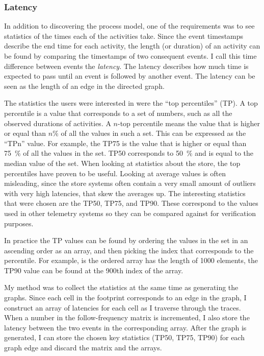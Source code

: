 \subsubsection{Latency}
\label{sec:latency}

In addition to discovering the process model, one of the requirements was to see statistics of the times each of the activities take. 
Since the event timestamps describe the end time for each activity, the length (or duration) of an activity can be found by comparing the timestamps of two consequent events. 
I call this time difference between events the \emph{latency}.
The latency describes how much time is expected to pass until an event is followed by another event.
The latency can be seen as the length of an edge in the directed graph.

The statistics the users were interested in were the ``top percentiles'' (TP).
A top percentile is a value that corresponds to a set of numbers, such as all the observed durations of activities.
A $n$-top percentile means the value that is higher or equal than $n\%$ of all the values in such a set.
This can be expressed as the ``TPn'' value.
For example, the TP75 is the value that is higher or equal than 75~\% of all the values in the set.
TP50 corresponds to 50~\% and is equal to the median value of the set.
When looking at statistics about the store, the top percentiles have proven to be useful.
Looking at average values is often misleading, since the store systems often contain a very small amount of outliers with very high latencies, that skew the averages up.
The interesting statistics that were chosen are the TP50, TP75, and TP90. 
These correspond to the values used in other telemetry systems so they can be compared against for verification purposes.

In practice the TP values can be found by ordering the values in the set in an ascending order as an array, and then picking the index that corresponds to the percentile. For example, is the ordered array has the length of 1000 elements, the TP90 value can be found at the 900th index of the array.

My method was to collect the statistics at the same time as generating the graphs.
Since each cell in the footprint corresponds to an edge in the graph, I construct an array of latencies for each cell as I traverse through the traces.
When a number in the follow-frequency matrix is incremented, I also store the latency between the two events in the corresponding array. 
After the graph is generated, I can store the chosen key statistics (TP50, TP75, TP90) for each graph edge and discard the matrix and the arrays.

